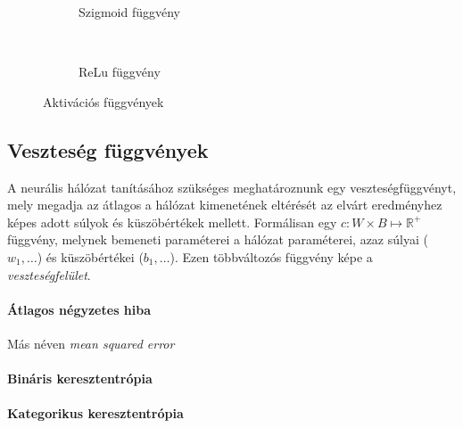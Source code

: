 \begin{figure}[h]
	\centering
	\begin{subfigure}[b]{0.3\textwidth}
		\def\svgwidth{0.5\columnwidth}
		
		\caption{Szigmoid függvény}
		\label{fig:sigmoid}
	\end{subfigure}
	~
	\begin{subfigure}[b]{0.3\textwidth}
		\def\svgwidth{0.5\columnwidth}
		
		\caption{ReLu függvény}
	\end{subfigure}
	\caption{Aktivációs függvények }
\end{figure}

\subsection{Veszteség függvények}
A neurális hálózat tanításához szükséges meghatároznunk egy veszteségfüggvényt, mely megadja az átlagos a hálózat kimenetének eltérését az elvárt eredményhez képes adott súlyok és küszöbértékek mellett. Formálisan egy $c:W\times B \mapsto \mathbb{R}^+$ függvény, melynek bemeneti paraméterei a hálózat paraméterei, azaz súlyai ($w_1,\dots$) és küszöbértékei ($b_1,\dots$). Ezen többváltozós függvény képe a \emph{veszteségfelület}. 
\paragraph[MSE]{Átlagos négyzetes hiba}
Más néven \emph{mean squared error}

\paragraph{Bináris keresztentrópia}

\paragraph{Kategorikus keresztentrópia}

